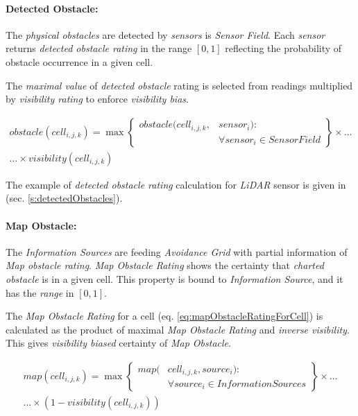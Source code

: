 \paragraph{Detected Obstacle:} The \emph{physical obstacles} are detected by \emph{sensors} is \emph{Sensor Field}. Each \emph{sensor} returns \emph{detected obstacle rating} in the range $[0,1]$ reflecting the probability of obstacle occurrence in a given  cell.

The \emph{maximal value} of \emph{detected obstacle} rating is selected from readings multiplied by \emph{visibility rating} to enforce \emph{visibility bias}.

\begin{multline}\label{eq:detectedObstacleRatingForCell}
    obstacle(cell_{i,j,k}) = \max \left\{\begin{aligned}obstacle(cell_{i,j,k},&sensor_i):\\&\forall sensor_i \in SensorField\end{aligned}\right\}\times\dots\\\dots\times visibility(cell_{i,j,k})
\end{multline}

\noindent The example of \emph{detected obstacle rating} calculation for \emph{LiDAR} sensor is given in (sec. \ref{s:detectedObstacles}).

\paragraph{Map Obstacle:} The \emph{Information Sources} are feeding \emph{Avoidance Grid} with partial information of \emph{Map obstacle rating}. \emph{Map Obstacle Rating} shows the certainty that \emph{charted obstacle} is in a given cell. This property is bound to \emph{Information Source}, and it has the \emph{range} in  $[0,1]$.

The \emph{Map Obstacle Rating} for a cell (eq. \ref{eq:mapObstacleRatingForCell}) is calculated as the product of maximal \emph{Map Obstacle Rating} and \emph{inverse visibility}. This gives \emph{visibility biased} certainty of \emph{Map Obstacle}.

\begin{multline}\label{eq:mapObstacleRatingForCell}
    map(cell_{i,j,k}) = \max 
    \left\{\begin{aligned}map(&cell_{i,j,k},source_i):\\&\forall source_i \in InformationSources\end{aligned}\right\}\times\dots\\\dots\times \left(1-visibility(cell_{i,j,k})\right)
\end{multline}

